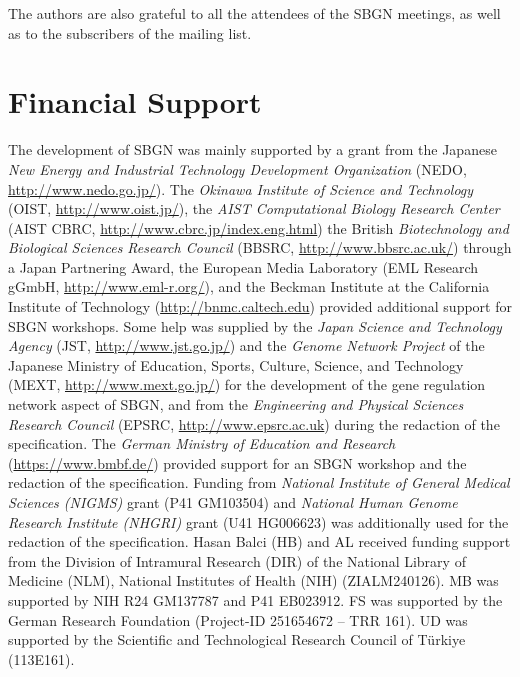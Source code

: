 The authors are also grateful to all the attendees of the SBGN meetings, as 
well as to the subscribers of the  mailing list.


\section{Financial Support}

The development of SBGN was mainly supported by a grant from the Japanese \emph{New Energy and Industrial Technology Development Organization} (NEDO, \url{http://www.nedo.go.jp/}).  The \emph{Okinawa Institute of Science and Technology} (OIST, \url{http://www.oist.jp/}), the \emph{AIST Computational Biology Research Center} (AIST CBRC, \url{http://www.cbrc.jp/index.eng.html}) the British \emph{Biotechnology and Biological Sciences Research Council} (BBSRC, \url{http://www.bbsrc.ac.uk/}) through a Japan Partnering Award, the European Media Laboratory (EML Research gGmbH, \url{http://www.eml-r.org/}), and the Beckman Institute at the California Institute of Technology (\url{http://bnmc.caltech.edu}) provided additional support for SBGN workshops. Some help was supplied by the \emph{Japan Science and Technology Agency} (JST, \url{http://www.jst.go.jp/}) and the \emph{Genome Network Project} of the Japanese Ministry of Education, Sports, Culture, Science, and Technology (MEXT, \url{http://www.mext.go.jp/}) for the development of the gene regulation network aspect of SBGN, and from the \emph{Engineering and Physical Sciences Research Council} (EPSRC, \url{http://www.epsrc.ac.uk}) during the redaction of the specification. The \emph{German Ministry of Education and Research} (\url{https://www.bmbf.de/}) provided support for an SBGN workshop and the redaction of the specification. Funding from \emph{National Institute of General Medical Sciences (NIGMS)} grant (P41 GM103504) and \emph{National Human Genome Research Institute (NHGRI)} grant (U41 HG006623) was additionally used for the redaction of the specification. Hasan Balci (HB) and AL received funding support from the Division of Intramural Research (DIR) of the National Library of Medicine (NLM), National Institutes of Health (NIH) (ZIALM240126). MB was supported by NIH R24 GM137787 and P41 EB023912. FS was supported by the German Research Foundation (Project-ID 251654672 – TRR 161). UD was supported by the Scientific and Technological Research Council of Türkiye (113E161).
